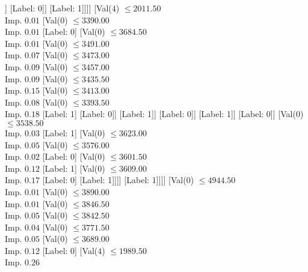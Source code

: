 \documentclass[margin=10pt]{standalone}
\begin{document}
\begin{forest}
												[Val($0$) $ \leq 3341.50$ \\ Imp. $0.11$
													[Val($0$) $ \leq 3338.50$ \\ Imp. $0.50$
														[Label: 0]
														[Label: 1]]
													[Label: 0]]
												[Label: 1]]]]
									[Val($4$) $ \leq 2011.50$ \\ Imp. $0.01$
										[Val($0$) $ \leq 3390.00$ \\ Imp. $0.01$
											[Label: 0]
											[Val($0$) $ \leq 3684.50$ \\ Imp. $0.01$
												[Val($0$) $ \leq 3491.00$ \\ Imp. $0.07$
													[Val($0$) $ \leq 3473.00$ \\ Imp. $0.09$
														[Val($0$) $ \leq 3457.00$ \\ Imp. $0.09$
															[Val($0$) $ \leq 3435.50$ \\ Imp. $0.15$
																[Val($0$) $ \leq 3413.00$ \\ Imp. $0.08$
																	[Val($0$) $ \leq 3393.50$ \\ Imp. $0.18$
																		[Label: 1]
																		[Label: 0]]
																	[Label: 1]]
																[Label: 0]]
															[Label: 1]]
														[Label: 0]]
													[Val($0$) $ \leq 3538.50$ \\ Imp. $0.03$
														[Label: 1]
														[Val($0$) $ \leq 3623.00$ \\ Imp. $0.05$
															[Val($0$) $ \leq 3576.00$ \\ Imp. $0.02$
																[Label: 0]
																[Val($0$) $ \leq 3601.50$ \\ Imp. $0.12$
																	[Label: 1]
																	[Val($0$) $ \leq 3609.00$ \\ Imp. $0.17$
																		[Label: 0]
																		[Label: 1]]]]
															[Label: 1]]]]
												[Val($0$) $ \leq 4944.50$ \\ Imp. $0.01$
													[Val($0$) $ \leq 3890.00$ \\ Imp. $0.01$
														[Val($0$) $ \leq 3846.50$ \\ Imp. $0.05$
															[Val($0$) $ \leq 3842.50$ \\ Imp. $0.04$
																[Val($0$) $ \leq 3771.50$ \\ Imp. $0.05$
																	[Val($0$) $ \leq 3689.00$ \\ Imp. $0.12$
																		[Label: 0]
																		[Val($4$) $ \leq 1989.50$ \\ Imp. $0.26$

\end{forest}
\end{document}
